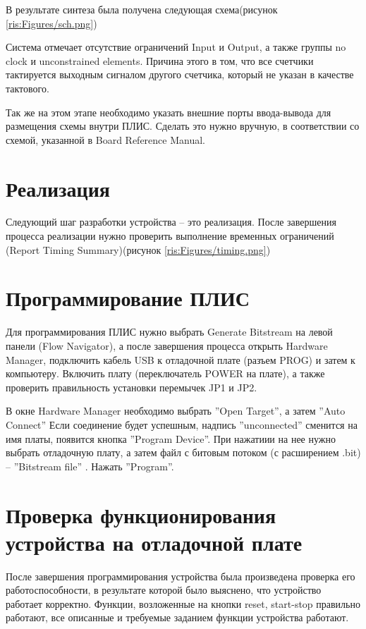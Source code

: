 \begin{sloppypar}
В результате синтеза была получена следующая схема(рисунок \ref{ris:Figures/sch.png})
\begin{landscape}
\end{landscape}

\newpage
Система отмечает отсутствие ограничений Input и Output, а также группы no clock и unconstrained elements. Причина этого в том, что все счетчики тактируется выходным сигналом другого счетчика, который не указан в качестве тактового.

Так же на этом этапе необходимо указать внешние порты ввода-вывода для размещения схемы внутри ПЛИС. Сделать это нужно вручную, в соответствии со схемой, указанной в Board Reference Manual.




\section{Реализация} %
Следующий шаг разработки устройства – это реализация.
После завершения процесса реализации нужно проверить выполнение временных ограничений (Report Timing Summary)(рисунок \ref{ris:Figures/timing.png})
\section{Программирование ПЛИС} %

Для программирования ПЛИС нужно выбрать Generate Bitstream на левой панели (Flow Navigator), а после завершения процесса открыть Hardware Manager, подключить кабель USB к отладочной плате (разъем PROG) и затем к компьютеру. Включить плату (переключатель POWER на плате), а также проверить правильность установки перемычек JP1 и JP2. 

В окне Hardware Manager необходимо выбрать ''Open Target'', а затем ''Auto Connect'' Если соединение будет успешным, надпись ''unconnected'' сменится на имя платы, появится кнопка ''Program Device''. При нажатиии на нее нужно выбрать отладочную плату, а затем файл с битовым потоком (с расширением
.bit) -- ''Bitstream file'' . Нажать ''Program''.

\section{Проверка функционирования устройства на отладочной плате} %
После завершения программирования устройства была произведена проверка его работоспособности, в результате которой было выяснено, что устройство работает корректно. Функции, возложенные на кнопки reset, start-stop правильно работают, все описанные и требуемые заданием функции устройства работают.

\end{sloppypar}
